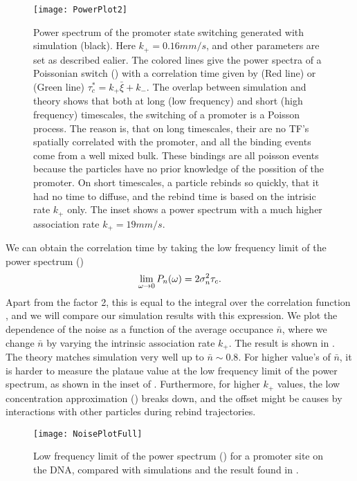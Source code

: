 \begin{figure}
\texttt{[image: PowerPlot2]}
\caption{ Power spectrum of the promoter state switching generated with simulation (black). Here $k_+=0.16mm/s$, and other parameters are set as described ealier. The colored lines give the power spectra of a Poissonian switch () with a correlation time given by (Red line)  or (Green line) $\tau_c^*=k_+ \bar{\xi}+k_-$. The overlap between simulation and theory shows that both at long (low frequency) and short (high frequency) timescales, the switching of a promoter is a Poisson process. The reason is, that on long timescales, their are no TF's spatially correlated with the promoter, and all the binding events come from a well mixed bulk. These bindings are all poisson events because the particles have no prior knowledge of the possition of the promoter. On short timescales, a particle rebinds so quickly, that it had no time to diffuse, and the rebind time is based on the intrisic rate $k_+$ only. The inset shows a power spectrum with a much higher association rate $k_+=19 mm/s$. 
}
\end{figure}

We can obtain the correlation time by taking the low frequency limit of the power spectrum ()
\begin{equation}
 \lim_{\omega\to0} P_n(\omega) = 2 \sigma_n^2 \tau_c.
 \elabel{PowPro}
\end{equation}
Apart from the factor 2, this is equal to the integral over the correlation function , and we will compare our simulation results with this expression. We plot the dependence of the noise as a function of the average occupance $\bar{n}$, where we change $\bar{n}$ by varying the intrinsic association rate $k_+$. The result is shown in . The theory matches simulation very well up to $\bar{n}\sim0.8$. For higher value's of $\bar{n}$, it is harder to measure the plataue value at the low frequency limit of the power spectrum, as shown in the inset of . Furthermore, for higher $k_+$ values, the low concentration approximation () breaks down, and the offset might be causes by interactions with other particles during rebind trajectories.

\begin{figure}
\texttt{[image: NoisePlotFull]}
\caption{ Low frequency limit of the power spectrum () for a promoter site on the DNA, compared with simulations and the result found in \cite{Tkacik2009}.
}
\end{figure}


